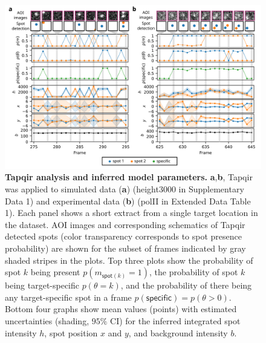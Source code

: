 \begin{figure}[t]
\centering
\includegraphics[width=\textwidth]{figures/figure3/figure3.png}
\caption{\textbf{Tapqir analysis and inferred model parameters.} \textbf{a},\textbf{b}, Tapqir was applied to simulated data (\textbf{a}) (height3000 in Supplementary Data 1) and experimental data (\textbf{b}) (polII in Extended Data Table 1). Each panel shows a short extract from a single target location in the dataset. AOI images and corresponding schematics of Tapqir detected spots (color transparency corresponds to spot presence probability) are shown for the subset of frames indicated by gray shaded stripes in the plots. Top three plots show the probability of spot $k$ being present $p(m_{\mathsf{spot}(k)}=1)$, the probability of spot $k$ being target-specific $p(\theta=k)$, and the probability of there being any target-specific spot in a frame $p(\mathsf{specific}) = p(\theta>0)$.  Bottom four graphs show mean values (points) with estimated uncertainties (shading, $95\%$ CI) for the inferred integrated spot intensity $h$, spot position $x$ and $y$, and background intensity $b$. }
\label{fig:tapqir_analysis}
\end{figure}



